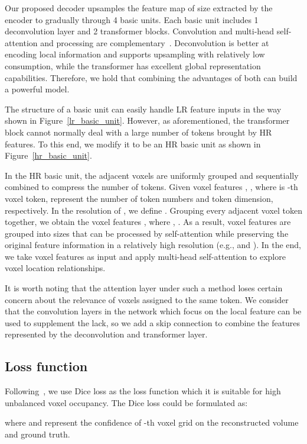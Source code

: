 \documentclass[10pt,twocolumn,letterpaper]{article}
\begin{document}
Our proposed decoder upsamples the feature map of size  extracted by the encoder to  gradually through 4 basic units. Each basic unit includes 1 deconvolution layer and 2 transformer blocks. Convolution and multi-head self-attention and processing are complementary~\cite{park2022how}. Deconvolution is better at encoding local information and supports upsampling with relatively low consumption, while the transformer has excellent global representation capabilities. Therefore, we hold that combining the advantages of both can build a powerful model.

The structure of a basic unit can easily handle LR feature inputs in the way shown in Figure~\ref{lr_basic_unit}. However, as aforementioned, the transformer block cannot normally deal with a large number of tokens brought by HR features. To this end, we modify it to be an HR basic unit as shown in Figure~\ref{hr_basic_unit}.

In the HR basic unit, the adjacent voxels are uniformly grouped and sequentially combined to compress the number of tokens. Given voxel features , , where  is -th voxel token,  represent the number of token numbers and token dimension, respectively. In the resolution of , we define . Grouping every  adjacent voxel token together, we obtain the voxel features , where , . As a result, voxel features  are grouped into sizes that can be processed by self-attention while preserving the original feature information in a relatively high resolution (e.g.,  and ). In the end, we take voxel features  as input and apply multi-head self-attention to explore voxel location relationships.

It is worth noting that the attention layer under such a method loses certain concern about the relevance of voxels assigned to the same token. We consider that the convolution layers in the network which focus on the local feature can be used to supplement the lack, so we add a skip connection to combine the features represented by the deconvolution and transformer layer.

\subsection{Loss function}
Following~\cite{shi20213d}, we use Dice loss \cite{milletari2016v} as the loss function which it is suitable for high unbalanced voxel occupancy. The Dice loss could be formulated as:

where  and  represent the confidence of -th voxel grid on the reconstructed volume and ground truth.
\end{document}
